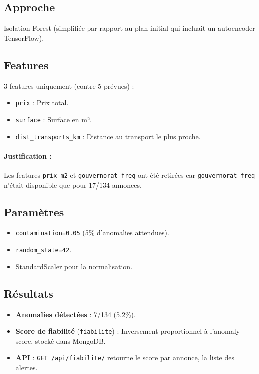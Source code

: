 \documentclass[12pt,a4paper]{report}
\begin{document}
\subsection{Approche}
Isolation Forest (simplifiée par rapport au plan initial qui incluait un autoencoder TensorFlow).

\subsection{Features}
3 features uniquement (contre 5 prévues) :
\begin{itemize}
    \item \texttt{prix} : Prix total.
    \item \texttt{surface} : Surface en m².
    \item \texttt{dist\_transports\_km} : Distance au transport le plus proche.
\end{itemize}

\paragraph{Justification :} Les features \texttt{prix\_m2} et \texttt{gouvernorat\_freq} ont été retirées car \texttt{gouvernorat\_freq} n'était disponible que pour 17/134 annonces.

\subsection{Paramètres}
\begin{itemize}
    \item \texttt{contamination=0.05} (5\% d'anomalies attendues).
    \item \texttt{random\_state=42}.
    \item StandardScaler pour la normalisation.
\end{itemize}

\subsection{Résultats}
\begin{itemize}
    \item \textbf{Anomalies détectées} : 7/134 (5.2\%).
    \item \textbf{Score de fiabilité} (\texttt{fiabilite}) : Inversement proportionnel à l'anomaly score, stocké dans MongoDB.
    \item \textbf{API} : \texttt{GET /api/fiabilite/} retourne le score par annonce, la liste des alertes.
\end{itemize}
\end{document}
